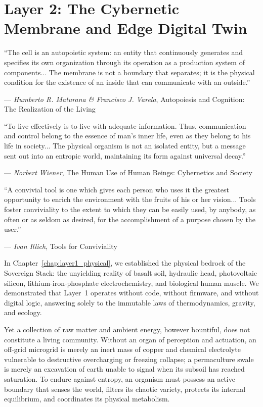 \chapter[Layer 2: The Cybernetic Membrane]{Layer 2: The Cybernetic Membrane and Edge Digital Twin}
\label{chap:layer2_membrane}

\epigraph{
    ``The cell is an autopoietic system: an entity that continuously generates and specifies its own organization through its operation as a production system of components... The membrane is not a boundary that separates; it is the physical condition for the existence of an inside that can communicate with an outside.''
}{--- \textit{Humberto R. Maturana \& Francisco J. Varela}, \textnormal{Autopoiesis and Cognition: The Realization of the Living} \parencite{maturana1980}}

\epigraph{
    ``To live effectively is to live with adequate information. Thus, communication and control belong to the essence of man's inner life, even as they belong to his life in society... The physical organism is not an isolated entity, but a message sent out into an entropic world, maintaining its form against universal decay.''
}{--- \textit{Norbert Wiener}, \textnormal{The Human Use of Human Beings: Cybernetics and Society} \parencite{wiener1954}}

\epigraph{
    ``A convivial tool is one which gives each person who uses it the greatest opportunity to enrich the environment with the fruits of his or her vision... Tools foster conviviality to the extent to which they can be easily used, by anybody, as often or as seldom as desired, for the accomplishment of a purpose chosen by the user.''
}{--- \textit{Ivan Illich}, \textnormal{Tools for Conviviality} \parencite{illich1973}}

In Chapter~\ref{chap:layer1_physical}, we established the physical bedrock of the Sovereign Stack: the unyielding reality of basalt soil, hydraulic head, photovoltaic silicon, lithium-iron-phosphate electrochemistry, and biological human muscle. We demonstrated that Layer~1 operates without code, without firmware, and without digital logic, answering solely to the immutable laws of thermodynamics, gravity, and ecology.

Yet a collection of raw matter and ambient energy, however bountiful, does not constitute a living community. Without an organ of perception and actuation, an off-grid microgrid is merely an inert mass of copper and chemical electrolyte vulnerable to destructive overcharging or freezing collapse; a permaculture swale is merely an excavation of earth unable to signal when its subsoil has reached saturation. To endure against entropy, an organism must possess an active boundary that senses the world, filters its chaotic variety, protects its internal equilibrium, and coordinates its physical metabolism.

